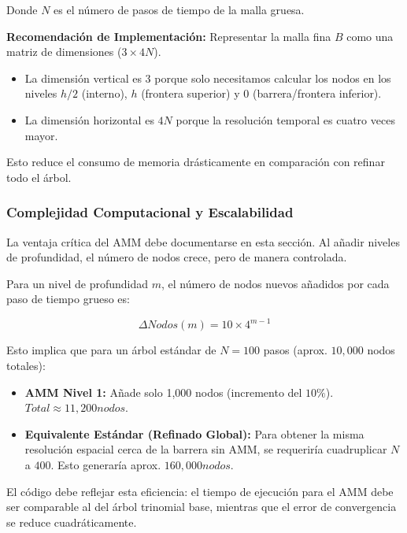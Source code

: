Donde $N$ es el número de pasos de tiempo de la malla gruesa.

\textbf{Recomendación de Implementación:} Representar la malla fina $B$ como una matriz de dimensiones ($3\times 4N$). 

\begin{itemize} 
  \item La dimensión vertical es $3$ porque solo necesitamos calcular los nodos en los niveles $h/2$ (interno), $h$ (frontera superior) y $0$ (barrera/frontera inferior). 
  
  \item La dimensión horizontal es $4N$ porque la resolución temporal es cuatro veces mayor. 
\end{itemize} 
Esto reduce el consumo de memoria drásticamente en comparación con refinar todo el árbol.

\subsubsection{Complejidad Computacional y Escalabilidad} 

La ventaja crítica del AMM debe documentarse en esta sección. Al añadir niveles de profundidad, el número de nodos crece, pero de manera controlada.

Para un nivel de profundidad $m$, el número de nodos nuevos añadidos por cada paso de tiempo grueso es: 

\begin{equation} 
  \Delta Nodos(m) = 10 \times 4^{m-1} 
\end{equation}

Esto implica que para un árbol estándar de $N=100$ pasos (aprox. $10,000$ nodos totales): 

\begin{itemize} 
  \item \textbf{AMM Nivel 1:} Añade solo 1,000 nodos (incremento del $10\%$). $Total \approx 11,200 nodos$. 
  
  \item \textbf{Equivalente Estándar (Refinado Global):} Para obtener la misma resolución espacial cerca de la barrera sin AMM, se requeriría cuadruplicar $N$ a $400$. Esto generaría aprox. $160,000 nodos$. 
\end{itemize}

El código debe reflejar esta eficiencia: el tiempo de ejecución para el AMM debe ser comparable al del árbol trinomial base, mientras que el error de convergencia se reduce cuadráticamente.


